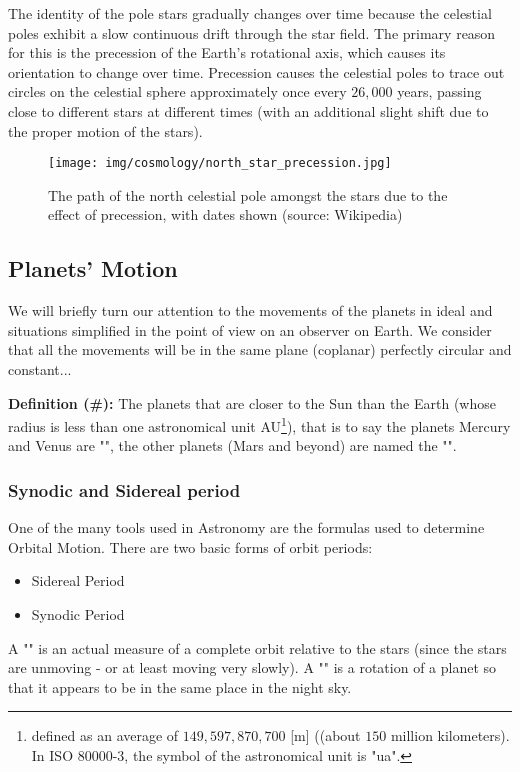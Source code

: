 	The identity of the pole stars gradually changes over time because the celestial poles exhibit a slow continuous drift through the star field. The primary reason for this is the precession of the Earth's rotational axis, which causes its orientation to change over time. Precession causes the celestial poles to trace out circles on the celestial sphere approximately once every $26,000$ years, passing close to different stars at different times (with an additional slight shift due to the proper motion of the stars).
	\begin{figure}[H]
		\centering
		\texttt{[image: img/cosmology/north\_star\_precession.jpg]}
		\caption[]{The path of the north celestial pole amongst the stars due to the effect of precession, with dates shown (source: Wikipedia)}
	\end{figure}
		
	\subsection{Planets' Motion}
	We will briefly turn our attention to the movements of the planets in ideal and situations simplified in the point of view on an observer on Earth. We consider that all the movements will be in the same plane (coplanar) perfectly circular and constant...

	\textbf{Definition (\#\mydef):} The planets that are closer to the Sun than the Earth (whose radius is less than one astronomical unit AU\footnote{defined as an average of $149,597,870,700$ [m] ((about $150$ million kilometers). In ISO 80000-3, the symbol of the astronomical unit is "ua".}), that is to say the planets Mercury and Venus are "", the other planets (Mars and beyond) are named the "".
	
	\subsubsection{Synodic and Sidereal period}
	One of the many tools used in Astronomy are the formulas used to determine Orbital Motion. There are two basic forms of orbit periods:
	\begin{itemize}
		\item Sidereal Period
		\item Synodic Period
	\end{itemize}
	A "" is an actual measure of a complete orbit relative to the stars (since the stars are unmoving - or at least moving very slowly). A "" is a rotation of a planet so that it appears to be in the same place in the night sky.
	
